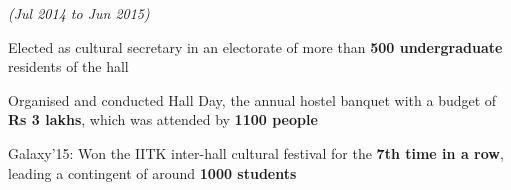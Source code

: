 \documentclass[a4paper]{deedy-resume} %
\begin{document}
\microspace
{}
\hfill {\textit{\small(Jul 2014 to Jun 2015)}}\\
\begin{tightitemize}
\item Elected as cultural secretary in an electorate of more than \textbf{500 undergraduate} residents of the hall
\item Organised and conducted Hall Day, the annual hostel banquet with a budget of \textbf{Rs 3 lakhs}, which was attended by \textbf{1100 people}
\item Galaxy'15: Won the IITK inter-hall cultural festival for the \textbf{7th time in a row}, leading a contingent of around \textbf{1000 students}
\end{tightitemize}




\end{document}
